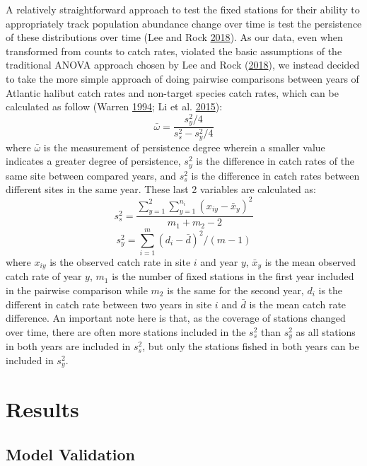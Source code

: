 \documentclass[12pt]{article}\usepackage[]{graphicx}\usepackage[]{color}
\begin{document}
A relatively straightforward approach to test the fixed stations for their ability to appropriately track population abundance change over time is test the persistence of these distributions over time (Lee and Rock \protect\hyperlink{ref-Lee2018}{2018}). As our data, even when transformed from counts to catch rates, violated the basic assumptions of the traditional ANOVA approach chosen by Lee and Rock (\protect\hyperlink{ref-Lee2018}{2018}), we instead decided to take the more simple approach of doing pairwise comparisons between years of Atlantic halibut catch rates and non-target species catch rates, which can be calculated as follow (Warren \protect\hyperlink{ref-Warren1994}{1994}; Li et al. \protect\hyperlink{ref-Li2015}{2015}):
\begin{equation}
\bar{\omega} = \frac{s^2_y/4}{s^2_s-s^2_y/4}
\end{equation}
where \(\bar{\omega}\) is the measurement of persistence degree wherein a smaller value indicates a greater degree of persistence, \(s^2_y\) is the difference in catch rates of the same site between compared years, and \(s^2_s\) is the difference in catch rates between different sites in the same year. These last 2 variables are calculated as:
\begin{equation}
s^2_s = \frac{\sum_{y=1}^2 \sum_{y=1}^{n_i} (x_{iy}-\bar{x}_y)^2}{m_1+m_2-2}
\end{equation} \begin{equation}
s^2_y = \sum_{i=1}^m (d_i - \bar{d})^2 / (m-1)
\end{equation}
where \(x_{iy}\) is the observed catch rate in site \(i\) and year \(y\), \(\bar{x}_y\) is the mean observed catch rate of year \(y\), \(m_1\) is the number of fixed stations in the first year included in the pairwise comparison while \(m_2\) is the same for the second year, \(d_i\) is the different in catch rate between two years in site \(i\) and \(\bar{d}\) is the mean catch rate difference. An important note here is that, as the coverage of stations changed over time, there are often more stations included in the \(s^2_s\) than \(s^2_y\) as all stations in both years are included in \(s^2_s\), but only the stations fished in both years can be included in \(s^2_y\).

\hypertarget{results}{%
\section{Results}\label{results}}

\hypertarget{model-validation}{%
\subsection{Model Validation}\label{model-validation}}
\end{document}
